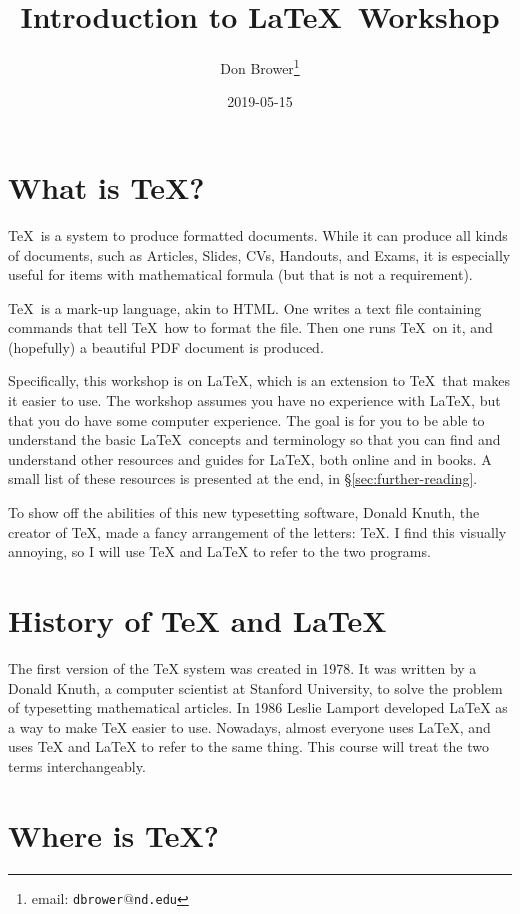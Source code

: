 \documentclass{article}
\begin{document}
\title{Introduction to \LaTeX\ Workshop}
\author{Don Brower\thanks{email: \texttt{dbrower$@$nd.edu}}}
\date{2019-05-15}
\maketitle

\section{What is \TeX?}

\TeX\ is a system to produce formatted documents.
While it can produce all kinds of documents, such as Articles, Slides, CVs, Handouts, and Exams,
it is especially useful for items with mathematical formula (but that is not a requirement).

\TeX\ is a mark-up language, akin to HTML.
One writes a text file containing commands that tell \TeX\ how to format the file.
Then one runs \TeX\ on it, and (hopefully) a beautiful PDF document is produced.

Specifically, this workshop is on \LaTeX, which is an extension to \TeX\ that makes it easier to use.
The workshop assumes you have no experience with \LaTeX, but that you do have some computer experience.
The goal is for you to be able to understand the basic \LaTeX\ concepts and terminology so that you can
find and understand other resources and guides for \LaTeX, both online and in books.
A small list of these resources is presented at the end, in \S\ref{sec:further-reading}.

To show off the abilities of this new typesetting software, Donald Knuth, the creator of \TeX,
made a fancy arrangement of the letters: \TeX.
I find this visually annoying, so I will use TeX and LaTeX to refer to the two programs.

\section{History of TeX and LaTeX}

The first version of the TeX system was created in 1978.
It was written by a Donald Knuth, a computer scientist at Stanford University,
to solve the problem of typesetting mathematical articles.
In 1986 Leslie Lamport developed LaTeX as a way to make TeX easier to use.
Nowadays, almost everyone uses LaTeX, and uses TeX and LaTeX to refer to the same
thing.
This course will treat the two terms interchangeably.

\section{Where is \TeX?}
\end{document}
